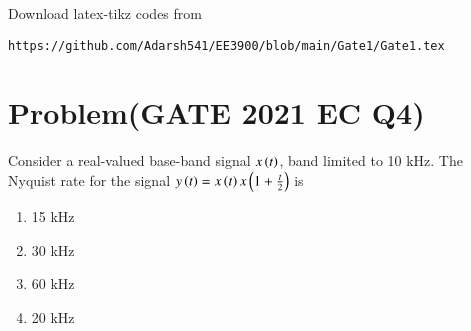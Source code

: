 \documentclass[journal,12pt,twocolumn]{IEEEtran}
\begin{document}
%
Download latex-tikz codes from 
%
\begin{lstlisting}
https://github.com/Adarsh541/EE3900/blob/main/Gate1/Gate1.tex
\end{lstlisting}
\section{Problem(GATE 2021 EC Q4)}
Consider a real-valued base-band signal $x\left(t\right)$, band limited to 10 kHz. The Nyquist rate for the signal $y\left(t\right) = x\left(t\right)x\left(1+\frac{t}{2}\right)$ is
\begin{enumerate}
    \item 15 kHz
    \item 30 kHz
    \item 60 kHz
    \item 20 kHz
\end{enumerate}
\end{document}
